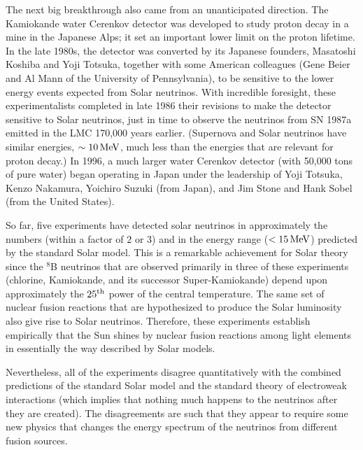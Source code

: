 \documentclass[a4paper,10pt]{article}
\begin{document}
{\noindent}The next big breakthrough also came from an unanticipated direction. The Kamiokande water Cerenkov detector was developed to study proton decay in a mine in the Japanese Alps; it set an important lower limit on the proton lifetime. In the late 1980s, the detector was converted by its Japanese founders, Masatoshi Koshiba and Yoji Totsuka, together with some American colleagues (Gene Beier and Al Mann of the University of Pennsylvania), to be sensitive to the lower energy events expected from Solar neutrinos. With incredible foresight, these experimentalists completed in late 1986 their revisions to make the detector sensitive to Solar neutrinos, just in time to observe the neutrinos from SN 1987a emitted in the LMC 170,000 years earlier. (Supernova and Solar neutrinos have similar energies, $\sim10\,{\rm MeV}$, much less than the energies that are relevant for proton decay.) In 1996, a much larger water Cerenkov detector (with 50,000 tons of pure water) began operating in Japan under the leadership of Yoji Totsuka, Kenzo Nakamura, Yoichiro Suzuki (from Japan), and Jim Stone and Hank Sobel (from the United States).

{\noindent}So far, five experiments have detected solar neutrinos in approximately the numbers (within a factor of $2$ or $3$) and in the energy range ($<15\,{\rm MeV}$) predicted by the standard Solar model. This is a remarkable achievement for Solar theory since the $^8$B neutrinos that are observed primarily in three of these experiments (chlorine, Kamiokande, and its successor Super-Kamiokande) depend upon approximately the $25^{\rm th}$ power of the central temperature. The same set of nuclear fusion reactions that are hypothesized to produce the Solar luminosity also give rise to Solar neutrinos. Therefore, these experiments establish empirically that the Sun shines by nuclear fusion reactions among light elements in essentially the way described by Solar models.

{\noindent}Nevertheless, all of the experiments disagree quantitatively with the combined predictions of the standard Solar model and the standard theory of electroweak interactions (which implies that nothing much happens to the neutrinos after they are created). The disagreements are such that they appear to require some new physics that changes the energy spectrum of the neutrinos from different fusion sources.
\end{document}
